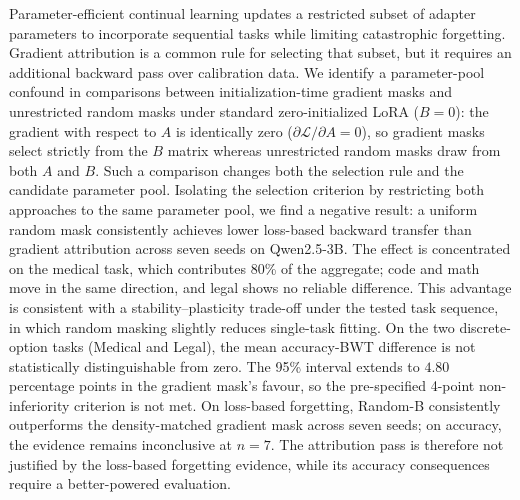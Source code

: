 Parameter-efficient continual learning updates a restricted subset of adapter parameters to incorporate sequential tasks while limiting catastrophic forgetting. Gradient attribution is a common rule for selecting that subset, but it requires an additional backward pass over calibration data. We identify a parameter-pool confound in comparisons between initialization-time gradient masks and unrestricted random masks under standard zero-initialized LoRA ($B=0$): the gradient with respect to $A$ is identically zero ($\partial\mathcal{L}/\partial A=0$), so gradient masks select strictly from the $B$ matrix whereas unrestricted random masks draw from both $A$ and $B$. Such a comparison changes both the selection rule and the candidate parameter pool. Isolating the selection criterion by restricting both approaches to the same parameter pool, we find a negative result: a uniform random mask consistently achieves lower loss-based backward transfer than gradient attribution across seven seeds on Qwen2.5-3B. The effect is concentrated on the medical task, which contributes 80\% of the aggregate; code and math move in the same direction, and legal shows no reliable difference. This advantage is consistent with a stability--plasticity trade-off under the tested task sequence, in which random masking slightly reduces single-task fitting. On the two discrete-option tasks (Medical and Legal), the mean accuracy-BWT difference is not statistically distinguishable from zero. The 95\% interval extends to $4.80$ percentage points in the gradient mask's favour, so the pre-specified 4-point non-inferiority criterion is not met. On loss-based forgetting, Random-B consistently outperforms the density-matched gradient mask across seven seeds; on accuracy, the evidence remains inconclusive at $n=7$. The attribution pass is therefore not justified by the loss-based forgetting evidence, while its accuracy consequences require a better-powered evaluation.
